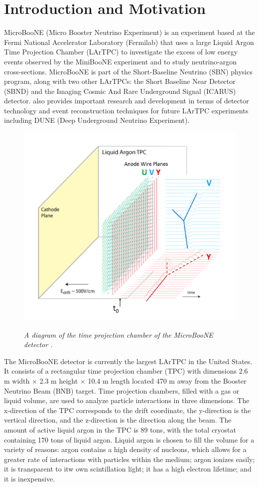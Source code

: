 \section{Introduction and Motivation}

MicroBooNE (Micro Booster Neutrino Experiment) is an experiment based at the Fermi National Accelerator Laboratory (Fermilab) that uses a large Liquid Argon Time Projection Chamber (LArTPC) to investigate the excess of low energy events observed by the MiniBooNE experiment \cite{Aguilar-Arevalo:2013pmq} and to study neutrino-argon cross-sections. MicroBooNE is part of the Short-Baseline Neutrino (SBN) physics program, along with two other LArTPCs: the Short Baseline Near Detector (SBND) and the Imaging Cosmic And Rare Underground Signal (ICARUS) detector. {\ub} also provides important research and development in terms of detector technology and event reconstruction techniques for future LArTPC experiments including DUNE (Deep Underground Neutrino Experiment).\\

\begin{figure}[ht!]
\centering
	\includegraphics[width=0.4\linewidth]{Figures/static_figs/detector2.png} \\
\caption{\textit{A diagram of the time projection chamber of the MicroBooNE detector \cite{lartpc}.}}\label{detector_fig}
\end{figure}

The MicroBooNE detector is currently the largest LArTPC in the United States. It consists of a rectangular time projection chamber (TPC) with dimensions 2.6 m width $\times$ 2.3 m height $\times$ 10.4 m length located 470 m away from the Booster Neutrino Beam (BNB) target. Time projection chambers, filled with a gas or liquid volume, are used to analyze particle interactions in three dimensions. The x-direction of the TPC corresponds to the drift coordinate, the y-direction is the vertical direction, and the z-direction is the direction along the beam. The amount of active liquid argon in the TPC is 89 tons, with the total cryostat containing 170 tons of liquid argon. Liquid argon is chosen to fill the volume for a variety of reasons: argon contains a high density of nucleons, which allows for a greater rate of interactions with particles within the medium; argon ionizes easily; it is transparent to itw own scintillation light; it has a high electron lifetime; and it is inexpensive.\\

